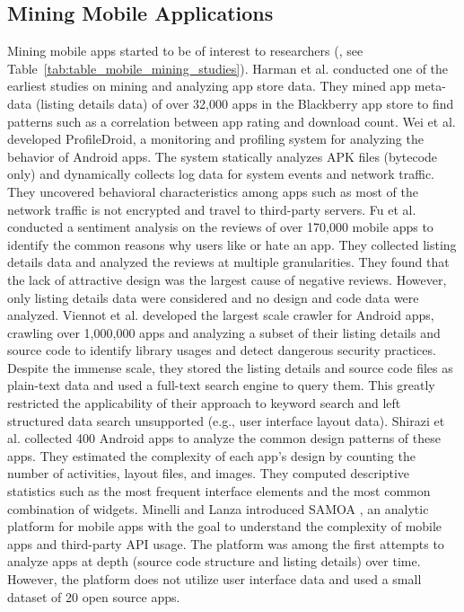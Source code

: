 \subsection{Mining Mobile Applications}
Mining mobile apps started to be of interest to researchers (\cite{Enck_2010_OSDI,Enck_2011_USENIX,Ma_WWW_2012,crussell_2012_ESORICS,Frank_2012_ICDM,zhou_2012_SP_dissecting,Yin_2013_WSDM,Petsas_2013_IMC,Minelli_2013_CMSREuro,Pandita_2013_USENIX,gorla_2014_ICSE,chen_2014_ICSE,Liu_2014_ICSE,Lin_2014_SOUPS,rasthofer_2014_NDSS,Liu_2015_MobiSys,seneviratne_2015_SIGMobile,Yang_2015_ICSE,Baeza-Yates_2015_WSDM,Chen_2015_WSDM,Liu_2015_WSDM,Tufano_ICSE_2015,Park_SIGIR_2015}, see Table~\ref{tab:table_mobile_mining_studies}).
Harman et al. \cite{Harman_2012_MSR} conducted one of the earliest studies on mining and analyzing app store data.
They mined app meta-data (listing details data) of over 32,000 apps in the Blackberry app store to find patterns such as a correlation between app rating and download count.
Wei et al. \cite{Wei_2012_MobiCom} developed ProfileDroid, a monitoring and profiling system for analyzing the behavior of Android apps.
The system statically analyzes APK files (bytecode only) and dynamically collects log data for system events and network traffic.
They uncovered behavioral characteristics among apps such as most of the network traffic is not encrypted and travel to third-party servers.
Fu et al. \cite{fu_2013_KDD} conducted a sentiment analysis on the reviews of over 170,000 mobile apps to identify the common reasons why users like or hate an app.
They collected listing details data and analyzed the reviews at multiple granularities.
They found that the lack of attractive design was the largest cause of negative reviews.
However, only listing details data were considered and no design and code data were analyzed.
Viennot et al. \cite{viennot_2014_metrics} developed the largest scale crawler for Android apps, crawling over 1,000,000 apps and analyzing a subset of their listing details and source code to identify library usages and detect dangerous security practices.
Despite the immense scale, they stored the listing details and source code files as plain-text data and used a full-text search engine to query them.
This greatly restricted the applicability of their approach to keyword search and left structured data search unsupported (e.g., user interface layout data).
Shirazi et al. \cite{shirazi_EICS_2013} collected 400 Android apps to analyze the common design patterns of these apps.
They estimated the complexity of each app's design by counting the number of activities, layout files, and images.
They computed descriptive statistics such as the most frequent interface elements and the most common combination of widgets.
Minelli and Lanza introduced SAMOA \cite{Minelli_2013_CMSREuro}, an analytic platform for mobile apps with the goal to understand the complexity of mobile apps and third-party API usage.
The platform was among the first attempts to analyze apps at depth (source code structure and listing details) over time.
However, the platform does not utilize user interface data and used a small dataset of 20 open source apps.

